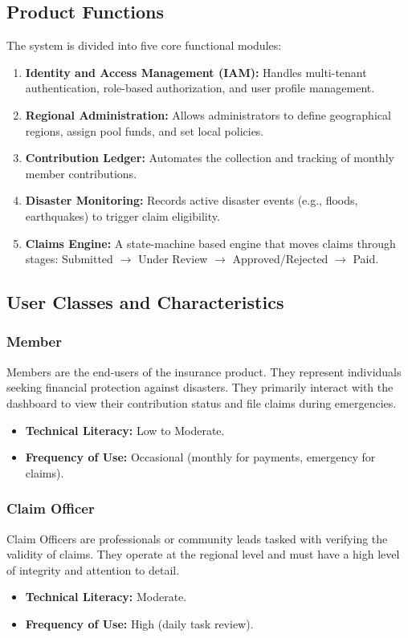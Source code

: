 \documentclass[12pt,a4paper]{article}
\begin{document}
\subsection{Product Functions}
The system is divided into five core functional modules:
\begin{enumerate}
    \item \textbf{Identity and Access Management (IAM):} Handles multi-tenant authentication, role-based authorization, and user profile management.
    \item \textbf{Regional Administration:} Allows administrators to define geographical regions, assign pool funds, and set local policies.
    \item \textbf{Contribution Ledger:} Automates the collection and tracking of monthly member contributions.
    \item \textbf{Disaster Monitoring:} Records active disaster events (e.g., floods, earthquakes) to trigger claim eligibility.
    \item \textbf{Claims Engine:} A state-machine based engine that moves claims through stages: Submitted $\rightarrow$ Under Review $\rightarrow$ Approved/Rejected $\rightarrow$ Paid.
\end{enumerate}

\subsection{User Classes and Characteristics}

\subsubsection{Member}
Members are the end-users of the insurance product. They represent individuals seeking financial protection against disasters. They primarily interact with the dashboard to view their contribution status and file claims during emergencies.
\begin{itemize}
    \item \textbf{Technical Literacy:} Low to Moderate.
    \item \textbf{Frequency of Use:} Occasional (monthly for payments, emergency for claims).
\end{itemize}

\subsubsection{Claim Officer}
Claim Officers are professionals or community leads tasked with verifying the validity of claims. They operate at the regional level and must have a high level of integrity and attention to detail.
\begin{itemize}
    \item \textbf{Technical Literacy:} Moderate.
    \item \textbf{Frequency of Use:} High (daily task review).
\end{itemize}
\end{document}

